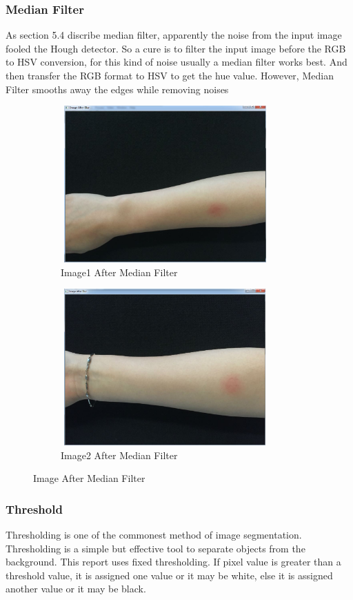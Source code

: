 \newpage
\subsubsection{Median Filter}
As section 5.4 discribe median filter, apparently the noise from the input image fooled the Hough detector. So a cure is to filter the input image before the RGB to HSV conversion, for this kind of noise usually a median filter works best. And then transfer the RGB format to HSV to get the hue value. However, Median Filter smooths away the edges while removing noises
 \begin{figure}[!h]
\centering
\begin{subfigure}{.5\textwidth}
  \centering
  \includegraphics[width=8cm,height=6cm]{img/detectfilter}
  \caption{Image1 After Median Filter}
  \label{fig:sub1}
\end{subfigure}%
\begin{subfigure}{.5\textwidth}
  \centering
  \includegraphics[width=8cm,height=6cm]{img/detectfilter2}
  \caption{Image2 After Median Filter}
  \label{fig:sub2}
\end{subfigure}
\caption{Image After Median Filter}
\label{fig:test}
\end{figure}

\subsubsection{Threshold}
Thresholding \cite{Zhang} is one of the commonest method of image segmentation. Thresholding is a simple but effective tool to separate objects from the background. This report uses fixed thresholding. If pixel value is greater than a threshold value, it is assigned one value or it may be white, else it is assigned another value or it may be black.\\

